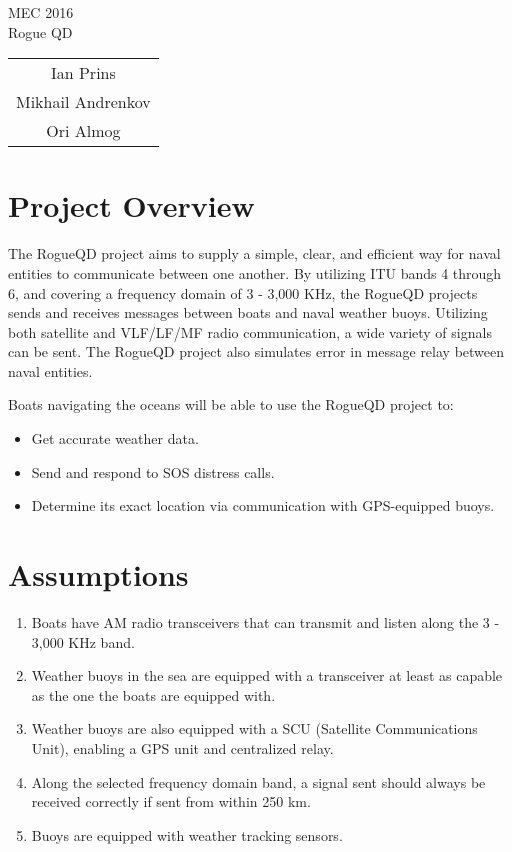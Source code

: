 \documentclass{article}
\begin{document}
\centering
\huge MEC 2016\\
\normalsize Rogue QD\\

\bigskip
\bigskip

%

\def \fsos {500\ }
\def \fdl {3\ }
\def \fdh {100\ }
\def \fbl {150\ }
\def \fbh {250\ }

\begin{tabular}{c}
	Ian Prins\\
	Mikhail Andrenkov\\
	Ori Almog\\
\end{tabular}

\newpage
\flushleft

\section{Project Overview} %

	The RogueQD project aims to supply a simple, clear, and efficient way for naval entities to communicate between one another. By utilizing ITU bands 4 through 6, and covering a frequency domain of 3 - 3,000 KHz, the RogueQD projects sends and receives messages between boats and naval weather buoys. Utilizing both satellite and VLF/LF/MF radio communication, a wide variety of signals can be sent. The RogueQD project also simulates error in message relay between naval entities.

	\bigskip

	Boats navigating the oceans will be able to use the RogueQD project to:

	\begin{itemize}
		\item Get accurate weather data.
		\item Send and respond to SOS distress calls.
		\item Determine its exact location via communication with GPS-equipped buoys. 
	\end{itemize}


\section{Assumptions} %

	\begin{enumerate}
		\item Boats have AM radio transceivers that can transmit and listen along the 3 - 3,000 KHz band.
		\item Weather buoys in the sea are equipped with a transceiver at least as capable as the one the boats are equipped with.
		\item Weather buoys are also equipped with a SCU (Satellite Communications Unit), enabling a GPS unit and centralized relay.
		\item Along the selected frequency domain band, a signal sent should always be received correctly if sent from within 250 km.
		\item Buoys are equipped with weather tracking sensors.
	\end{enumerate}
\end{document}
